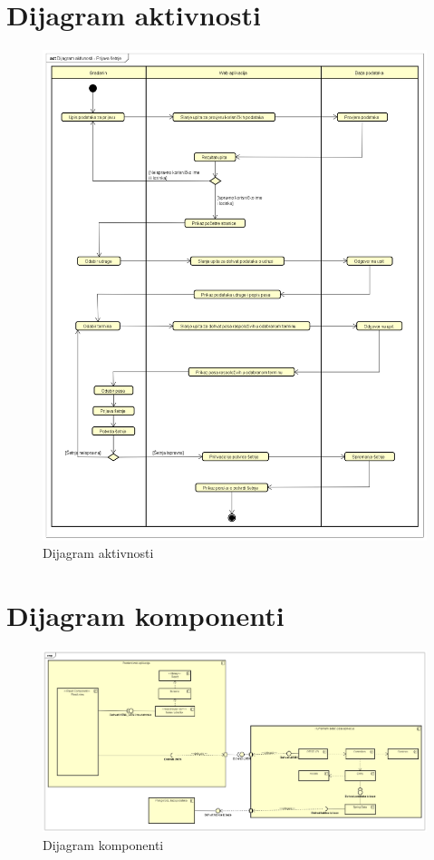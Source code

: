 			\section{Dijagram aktivnosti}
			\begin{figure}[H]
				\includegraphics[width=\linewidth]{slike/D_akt.png}
				\centering
				\caption{Dijagram aktivnosti}
				\label{fig:dijagramaktivnosti}
			\end{figure}
			
			\eject
			
			\section{Dijagram komponenti}
			\begin{figure}[H]
				\includegraphics[width=\linewidth]{slike/ComponentDiagram3.png}
				\centering
				\caption{Dijagram komponenti}
				\label{fig:dijagramkomponenti}
			\end{figure}
